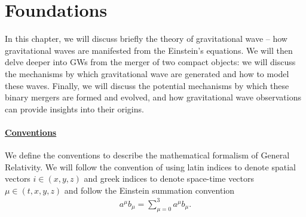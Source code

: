 \chapter{Foundations}

In this chapter, we will discuss briefly the theory of gravitational wave -- how gravitational waves are manifested from the Einstein's equations. We will then delve deeper into GWs from the merger of two compact objects: we will discuss the mechanisms by which gravitational wave are generated and how to model these waves. Finally, we will discuss the potential mechanisms by which these binary mergers are formed and evolved, and how gravitational wave observations can provide insights into their origins. 

\subsubsection{\underline{Conventions}}
We define the conventions to describe the mathematical formalism of General Relativity. We will follow the convention of using latin indices to denote spatial vectors $i \in (x,y,z)$ and greek indices to denote space-time vectors $\mu \in (t, x, y, z)$ and follow the Einstein summation convention
\begin{align}
    a^{\mu}b_{\mu} = \sum_{\mu = 0}^{3} a^{\mu}b_{\mu}.
\end{align}

